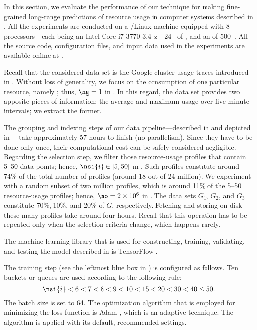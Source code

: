 In this section, we evaluate the performance of our technique for making
fine-grained long-range predictions of resource usage in computer systems
described in . All the experiments are conducted on a
/Linux machine equipped with 8 processors---each being an Intel Core
i7-3770 3.4~z---24~ of , and an  of 500~.
All the source code, configuration files, and input data used in the experiments
are available online at \cite{eslab2017b}.


Recall that the considered data set is the Google cluster-usage traces
\cite{reiss2011} introduced in . Without loss of
generality, we focus on the consumption of one particular resource, namely
; thus, $\ng = 1$ in . In this regard, the data set
provides two apposite pieces of information: the average and maximum 
usage over five-minute intervals; we extract the former.

The grouping and indexing steps of our data pipeline---described in
 and depicted in ---take
approximately 57 hours to finish (no parallelism). Since they have to be done
only once, their computational cost can be safely considered negligible.
Regarding the selection step, we filter those resource-usage profiles that
contain 5--50 data points; hence, $\nsi{i} \in [5, 50]$ in .
Such profiles constitute around 74\% of the total number of profiles (around 18
out of 24 million). We experiment with a random subset of two million profiles,
which is around 11\% of the 5--50 resource-usage profiles; hence, $\no = 2
\times 10^6$ in . The data sets $G_1$, $G_2$, and $G_3$
constitute 70\%, 10\%, and 20\% of $G$, respectively. Fetching and storing on
disk these many profiles take around four hours. Recall that this operation has
to be repeated only when the selection criteria change, which happens rarely.


The machine-learning library that is used for constructing, training,
validating, and testing the model described in  is
TensorFlow \cite{abadi2015}.

The training step (see the leftmost blue box in ) is
configured as follows. Ten buckets or queues are used according to the following
rule:
\[
  \nsi{i} < 6 < 7 < 8 < 9 < 10 < 15 < 20 < 30 < 40 \leq 50.
\]
The batch size \nb is set to 64. The optimization algorithm that is employed for
minimizing the loss function is Adam \cite{kingma2014}, which is an adaptive
technique. The algorithm is applied with its default, recommended settings.

